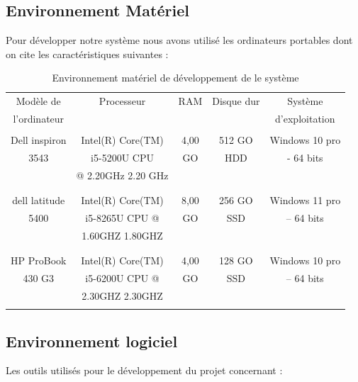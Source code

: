 \documentclass[edit,12pt,a4paper,ChapStyle,oneside,doubleinterligne]{report}
\begin{document}
\subsection{Environnement Matériel }
Pour développer notre système nous avons utilisé les ordinateurs portables dont on cite les caractéristiques suivantes :  
\begin{table}[h!]
    \centering
    \begin{tabular}{|c|c|c|c|c|}
    \hline
        Modèle de & Processeur & RAM & Disque dur & Système  \\
        l’ordinateur & & & & d’exploitation \\
        \hline
        &&&&\\
         Dell inspiron & Intel(R) Core(TM)   & 4,00  & 512 GO & Windows 10 pro  \\
         3543 & i5-5200U CPU & GO  & HDD & - 64 bits \\
         & @ 2.20GHz   2.20 GHz & & &\\
         &&&&\\
         \hline
        &&&&\\
         dell latitude  & Intel(R) Core(TM)  & 8,00 & 256 GO & Windows 11 pro  \\
         5400 & i5-8265U CPU @ & GO & SSD & – 64 bits \\
         & 1.60GHZ 1.80GHZ & & &\\
         &&&&\\
         \hline
         &&&&\\
         HP ProBook  & Intel(R) Core(TM)   & 4,00& 128 GO  & Windows 10 pro  \\
         430 G3 & i5-6200U CPU @ & GO & SSD & – 64 bits\\
         & 2.30GHZ 2.30GHZ & & &\\
         &&&&\\
         \hline
    \end{tabular}
    \caption{Environnement matériel de développement de le système}
    \label{tab:materiel}
\end{table}
\subsection{Environnement logiciel }
Les outils utilisés pour le développement du projet concernant :
\end{document}
